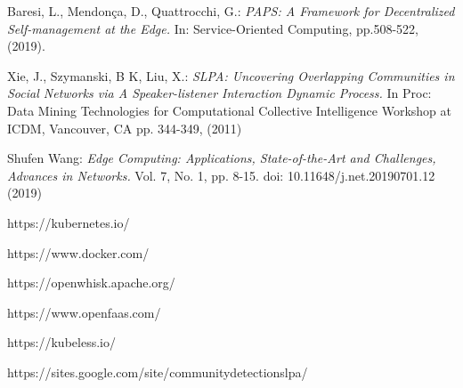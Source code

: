 \begin{thebibliography}{9}
        Baresi, L., Mendonça, D., Quattrocchi, G.: 
        \textit{PAPS: A Framework for Decentralized Self-management at the Edge.}
        In: Service-Oriented Computing, pp.508-522, (2019).   

        Xie, J., Szymanski, B K, Liu, X.:
        \textit{SLPA: Uncovering Overlapping Communities in Social Networks via
        A Speaker-listener Interaction Dynamic Process.}
        In Proc: Data Mining Technologies for Computational Collective 
        Intelligence Workshop at ICDM, Vancouver, CA pp. 344-349, (2011)

        Shufen Wang:
        \textit{Edge Computing: Applications, State-of-the-Art and Challenges, Advances in Networks.}
        Vol. 7, No. 1, pp. 8-15. doi: 10.11648/j.net.20190701.12 (2019)

        https://kubernetes.io/

        https://www.docker.com/

        https://openwhisk.apache.org/

        https://www.openfaas.com/

        https://kubeless.io/

        https://sites.google.com/site/communitydetectionslpa/    

\end{thebibliography}